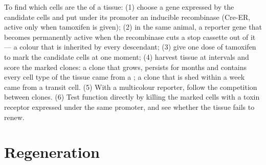 \begin{method}\label{met:b3:stem-cells:tracing}
To find which cells are the  of a tissue: (1) choose a gene
expressed by the candidate cells and put under its promoter an
inducible recombinase (Cre-ER, active only when tamoxifen is given);
(2) in the same animal, a reporter gene that becomes permanently
active when the recombinase cuts a stop cassette out of it --- a
colour that is inherited by every descendant; (3) give one dose of
tamoxifen to mark the candidate cells at one moment; (4) harvest
tissue at intervals and score the marked clones: a clone that grows,
persists for months and contains every cell type of the tissue came
from a ; a clone that is shed within a week came from a
transit cell. (5) With a multicolour reporter, follow the competition
between clones. (6) Test function directly by killing the marked cells
with a toxin receptor expressed under the same promoter, and see
whether the tissue fails to renew.
\end{method}

\section{Regeneration}

